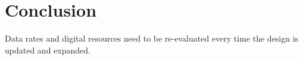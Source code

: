 \section{Conclusion}
\label{sec:conclusion}





Data rates and digital resources need to be re-evaluated every time the design is updated and expanded.